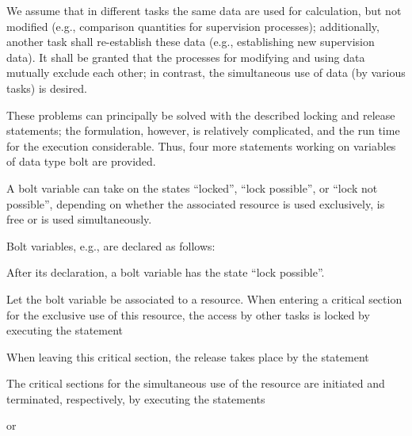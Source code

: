 We assume that in different tasks the same data are used for
calculation, but not modified (e.g., comparison quantities for
supervision processes); additionally, another task shall re-establish
these data (e.g., establishing new supervision data). It shall be
granted that the processes for modifying and using data mutually exclude
each other; in contrast, the simultaneous use of data (by various tasks)
is desired.

These problems can principally be solved with the described locking and
release statements; the formulation, however, is relatively
complicated, and the run time for the execution considerable. Thus, four
more statements working on variables of data type bolt are provided.

A bolt variable can take on the states ``locked'', ``lock possible'', or
``lock not possible'', depending on whether the associated resource
is used exclusively, is free or is used simultaneously.

Bolt variables, e.g., are declared as follows:

\code{;}

After its declaration, a bolt variable has the state ``lock possible''.

Let the bolt variable  be associated to a resource. When entering a
critical section for the exclusive use of this resource, the access by
other tasks is locked by executing the statement


When leaving this critical section, the release takes place by the
statement


The critical sections for the simultaneous use of the resource are
initiated and terminated, respectively, by executing the statements

 or 

